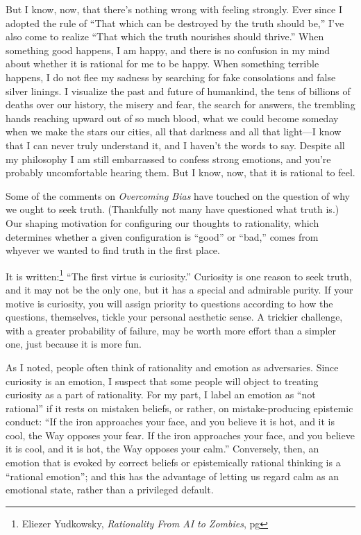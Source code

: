 {
 But I know, now, that there's nothing wrong with
feeling strongly. Ever since I adopted the rule of
``That which can be destroyed by the truth should
be,'' I've also come to realize
``That which the truth nourishes should
thrive.'' When something good happens, I am happy,
and there is no confusion in my mind about whether it is rational for
me to be happy. When something terrible happens, I do not flee my
sadness by searching for fake consolations and false silver linings. I
visualize the past and future of humankind, the tens of billions of
deaths over our history, the misery and fear, the search for answers,
the trembling hands reaching upward out of so much blood, what we could
become someday when we make the stars our cities, all that darkness and
all that light---I know that I can never truly understand it, and I
haven't the words to say. Despite all my philosophy I
am still embarrassed to confess strong emotions, and
you're probably uncomfortable hearing them. But I know,
now, that it is rational to feel.}

\myendsectiontext

\label{why_truth}

{
 Some of the comments on \textit{Overcoming Bias} have touched on
the question of why we ought to seek truth. (Thankfully not many have
questioned what truth is.) Our shaping motivation for configuring our
thoughts to rationality, which determines whether a given configuration
is ``good'' or
``bad,'' comes from whyever we
wanted to find truth in the first place. }

{
 It is written:\footnote{Eliezer Yudkowsky, {\em Rationality From AI to Zombies}, pg \pageref{twelve_virtues}} ``The first virtue is
curiosity.'' Curiosity is one reason to seek truth,
and it may not be the only one, but it has a special and admirable
purity. If your motive is curiosity, you will assign priority to
questions according to how the questions, themselves, tickle your
personal aesthetic sense. A trickier challenge, with a greater
probability of failure, may be worth more effort than a simpler one,
just because it is more fun.}

{
 As I noted, people often think of rationality and emotion as
adversaries. Since curiosity is an emotion, I suspect that some people
will object to treating curiosity as a part of rationality. For my
part, I label an emotion as ``not
rational'' if it rests on mistaken beliefs, or
rather, on mistake-producing epistemic conduct: ``If
the iron approaches your face, and you believe it is hot, and it is
cool, the Way opposes your fear. If the iron approaches your face, and
you believe it is cool, and it is hot, the Way opposes your
calm.'' Conversely, then, an emotion that is evoked
by correct beliefs or epistemically rational thinking is a
``rational emotion''; and this has
the advantage of letting us regard calm as an emotional state, rather
than a privileged default.}

